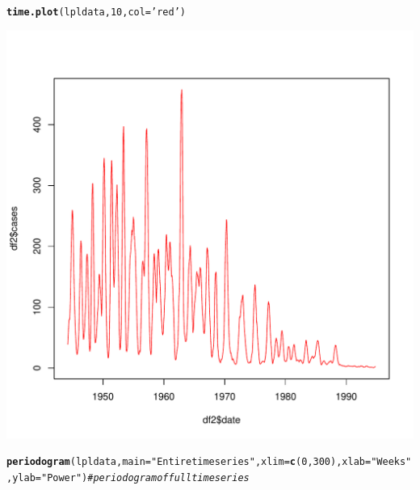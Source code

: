\documentclass[12pt]{article}\usepackage[]{graphicx}\usepackage[]{color}
\makeatletter
\def\maxwidth{ %
  \ifdim\Gin@nat@width>\linewidth
    \linewidth
  \else
    \Gin@nat@width
  \fi
}
\newcommand{\hlnum}[1]{\textcolor[rgb]{0.686,0.059,0.569}{#1}}%
\newcommand{\hlstr}[1]{\textcolor[rgb]{0.192,0.494,0.8}{#1}}%
\newcommand{\hlcom}[1]{\textcolor[rgb]{0.678,0.584,0.686}{\textit{#1}}}%
\newcommand{\hlstd}[1]{\textcolor[rgb]{0.345,0.345,0.345}{#1}}%
\newcommand{\hlkwc}[1]{\textcolor[rgb]{0.333,0.667,0.333}{#1}}%
\newcommand{\hlkwd}[1]{\textcolor[rgb]{0.737,0.353,0.396}{\textbf{#1}}}%
\newenvironment{kframe}{%
 \def\at@end@of@kframe{}%
 \ifinner\ifhmode%
  \def\at@end@of@kframe{\end{minipage}}%
  \begin{minipage}{\columnwidth}%
 \fi\fi%
 \def\FrameCommand##1{\hskip\@totalleftmargin \hskip-\fboxsep
 \colorbox{shadecolor}{##1}\hskip-\fboxsep
     \hskip-\linewidth \hskip-\@totalleftmargin \hskip\columnwidth}%
 \MakeFramed {\advance\hsize-\width
   \@totalleftmargin\z@ \linewidth\hsize
   \@setminipage}}%
 {\par\unskip\endMakeFramed%
 \at@end@of@kframe}
\newenvironment{knitrout}{}{} %
\makeatother
\begin{document}
\begin{enumerate}[(a)]
\begin{knitrout}
\begin{kframe}\begin{alltt}
\hlkwd{time.plot}\hlstd{(lpldata,}\hlnum{10}\hlstd{,}\hlkwc{col}\hlstd{=}\hlstr{'red'}\hlstd{)}
\end{alltt}
\end{kframe}
\includegraphics[width=\maxwidth]{figure/unnamed-chunk-5-2} 
\begin{kframe}\begin{alltt}
\hlkwd{periodogram}\hlstd{(lpldata,} \hlkwc{main}\hlstd{=}\hlstr{"Entire timeseries"}\hlstd{,}\hlkwc{xlim}\hlstd{=}\hlkwd{c}\hlstd{(}\hlnum{0}\hlstd{,}\hlnum{300}\hlstd{),}\hlkwc{xlab}\hlstd{=}\hlstr{"Weeks"}\hlstd{,} \hlkwc{ylab}\hlstd{=}\hlstr{"Power"}\hlstd{)} \hlcom{#periodogram of full time series}
\end{alltt}
\end{kframe}

\end{knitrout}
\end{enumerate}
\end{document}
